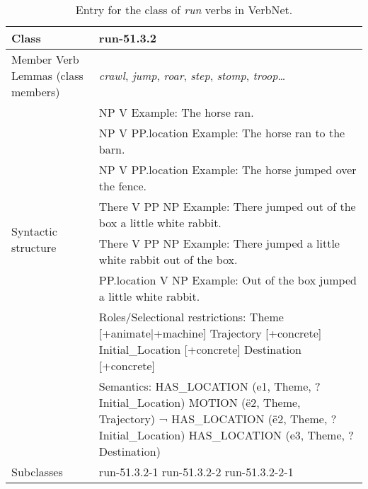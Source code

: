 \documentclass[english]{textolivre}
\begin{document}
\begin{table}[h!]
\centering
\begin{threeparttable}
\caption{Entry for the class of \textit{run} verbs in VerbNet.}
\label{Table1}
\begin{tabular} {lp{}}
\toprule
Class & run-51.3.2 \\
\midrule
Member Verb Lemmas (class members) & \textit{crawl}, \textit{jump}, \textit{roar}, \textit{step}, \textit{stomp}, \textit{troop}…\protect\footnotemark \\
\midrule 
\multirow{7}{*}{Syntactic structure} 
& NP V \newline
Example: The horse ran. \\
& NP V PP.location \newline
Example: The horse ran to the barn. \\
& NP V PP.location \newline
Example: The horse jumped over the fence.\\
& There V PP NP \newline
Example: There jumped out of the box a little white rabbit. \\
& There V PP NP \newline 
Example: There jumped a little white rabbit out of the box. \\
& PP.location V NP \newline
Example: Out of the box jumped a little white rabbit.\\
\midrule
\multirow{2}{*}{Semantic structure \protect\footnotemark} 
& Roles/Selectional restrictions: \newline
Theme [+animate|+machine] \newline
Trajectory [+concrete] \newline 
Initial\_Location [+concrete] \newline
Destination [+concrete] \\
& Semantics: \newline
HAS\_LOCATION (e1\protect\footnotemark, Theme, ?Initial\_Location) \newline
MOTION (ë2, Theme, Trajectory) \newline
¬ HAS\_LOCATION (ë2, Theme, ?Initial\_Location) \newline
HAS\_LOCATION (e3, Theme, ?Destination) \\
\midrule
Subclasses & run-51.3.2-1 \newline
run-51.3.2-2 \newline
run-51.3.2-2-1 \\
\bottomrule
\end{tabular}
\end{threeparttable}
\end{table}
\end{document}
